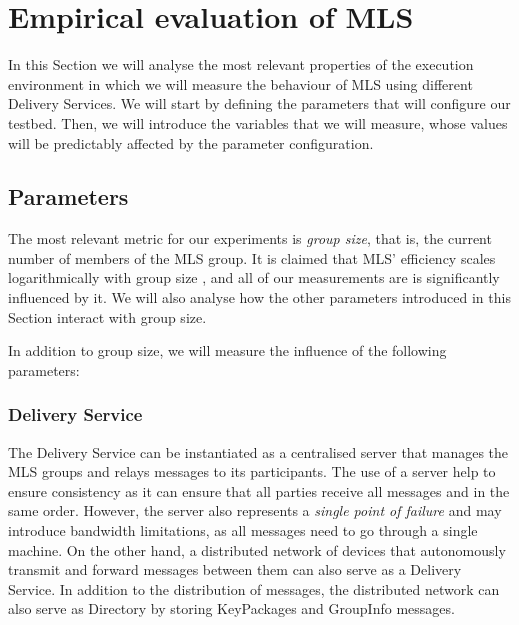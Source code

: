 \documentclass[preprint, 12pt]{elsarticle}
\begin{document}

\section{Empirical evaluation of MLS} 
\label{sec:env}

In this Section we will analyse the most relevant properties of the execution environment in which we will measure the behaviour of MLS using different Delivery Services. We will start by defining the parameters that will configure our testbed. Then, we will introduce the variables that we will measure, whose values will be predictably affected by the parameter configuration.

\subsection{Parameters}
\label{sec:parameters}

The most relevant metric for our experiments is \textit{group size}, that is, the current number of members of the MLS group. It is claimed that MLS' efficiency scales logarithmically with group size \cite{saik, cocoa}, and all of our measurements are is significantly influenced by it. We will also analyse how the other parameters introduced in this Section interact with group size.

In addition to group size, we will measure the influence of the following parameters: 

\subsubsection{Delivery Service}

The Delivery Service can be instantiated as a centralised server that manages the MLS groups and relays messages to its participants. The use of a server help to ensure consistency as it can ensure that all parties receive all messages and in the same order. However, the server also represents a \textit{single point of failure} and may introduce bandwidth limitations, as all messages need to go through a single machine. On the other hand, a distributed network of devices that autonomously transmit and forward messages between them can also serve as a Delivery Service. In addition to the distribution of messages, the distributed network can also serve as Directory by storing KeyPackages and GroupInfo messages. 
\end{document}
